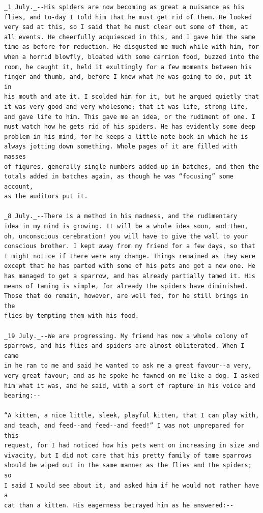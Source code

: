\documentclass{article}
\begin{document}
\begin{verbatim}
_1 July._--His spiders are now becoming as great a nuisance as his
flies, and to-day I told him that he must get rid of them. He looked
very sad at this, so I said that he must clear out some of them, at
all events. He cheerfully acquiesced in this, and I gave him the same
time as before for reduction. He disgusted me much while with him, for
when a horrid blowfly, bloated with some carrion food, buzzed into the
room, he caught it, held it exultingly for a few moments between his
finger and thumb, and, before I knew what he was going to do, put it in
his mouth and ate it. I scolded him for it, but he argued quietly that
it was very good and very wholesome; that it was life, strong life,
and gave life to him. This gave me an idea, or the rudiment of one. I
must watch how he gets rid of his spiders. He has evidently some deep
problem in his mind, for he keeps a little note-book in which he is
always jotting down something. Whole pages of it are filled with masses
of figures, generally single numbers added up in batches, and then the
totals added in batches again, as though he was “focusing” some account,
as the auditors put it.

_8 July._--There is a method in his madness, and the rudimentary
idea in my mind is growing. It will be a whole idea soon, and then,
oh, unconscious cerebration! you will have to give the wall to your
conscious brother. I kept away from my friend for a few days, so that
I might notice if there were any change. Things remained as they were
except that he has parted with some of his pets and got a new one. He
has managed to get a sparrow, and has already partially tamed it. His
means of taming is simple, for already the spiders have diminished.
Those that do remain, however, are well fed, for he still brings in the
flies by tempting them with his food.

_19 July._--We are progressing. My friend has now a whole colony of
sparrows, and his flies and spiders are almost obliterated. When I came
in he ran to me and said he wanted to ask me a great favour--a very,
very great favour; and as he spoke he fawned on me like a dog. I asked
him what it was, and he said, with a sort of rapture in his voice and
bearing:--

“A kitten, a nice little, sleek, playful kitten, that I can play with,
and teach, and feed--and feed--and feed!” I was not unprepared for this
request, for I had noticed how his pets went on increasing in size and
vivacity, but I did not care that his pretty family of tame sparrows
should be wiped out in the same manner as the flies and the spiders; so
I said I would see about it, and asked him if he would not rather have a
cat than a kitten. His eagerness betrayed him as he answered:--


\end{verbatim}
\end{document}
